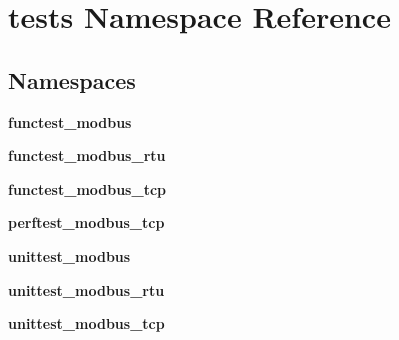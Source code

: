 \section{tests Namespace Reference}
\label{namespacetests}
\subsection*{Namespaces}
\begin{DoxyCompactItemize}
\item 
 {\bf functest\+\_\+modbus}
\item 
 {\bf functest\+\_\+modbus\+\_\+rtu}
\item 
 {\bf functest\+\_\+modbus\+\_\+tcp}
\item 
 {\bf perftest\+\_\+modbus\+\_\+tcp}
\item 
 {\bf unittest\+\_\+modbus}
\item 
 {\bf unittest\+\_\+modbus\+\_\+rtu}
\item 
 {\bf unittest\+\_\+modbus\+\_\+tcp}
\end{DoxyCompactItemize}
